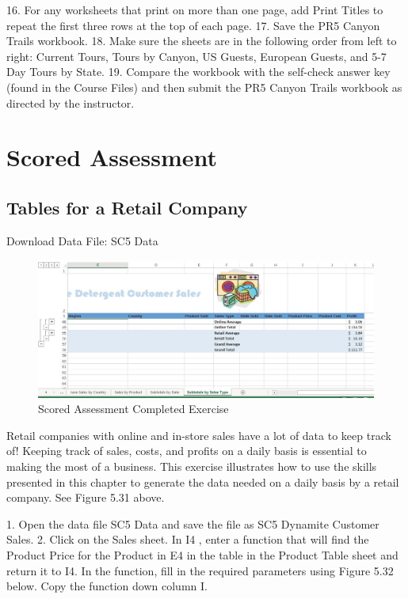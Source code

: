 16. For any worksheets that print on more than one page, add Print Titles to repeat the first three
rows at the top of each page.
17. Save the PR5 Canyon Trails workbook.
18. Make sure the sheets are in the following order from left to right: Current Tours, Tours by Canyon, US Guests, European Guests, and 5-7 Day Tours by State.
19. Compare the workbook with the self-check answer key (found in the Course Files) and then submit the PR5 Canyon Trails workbook as directed by the instructor.

\section{Scored Assessment}

\subsection{Tables for a Retail Company}

Download Data File: SC5 Data


\begin{figure}[H]
	\centering
	\includegraphics[width=\maxwidth{.95\linewidth}]{gfx/ch05_fig31}
	\caption{Scored Assessment Completed Exercise}
	\label{05:fig31}
\end{figure}



Retail companies with online and in-store sales have a lot of data to keep track of!
Keeping track of sales, costs, and profits on a daily basis is essential to making the most of a business.
This exercise illustrates how to use the skills presented in this chapter to generate the data needed on
a daily basis by a retail company. See Figure 5.31 above.

1. Open the data file SC5 Data and save the file as SC5 Dynamite Customer
Sales.
2. Click on the Sales sheet. In I4 , enter a  function that will find the Product Price for
the Product in E4 in the table in the Product Table sheet and return it to I4. In the 
function, fill in the required parameters using Figure 5.32 below. Copy the  function
down column I.


